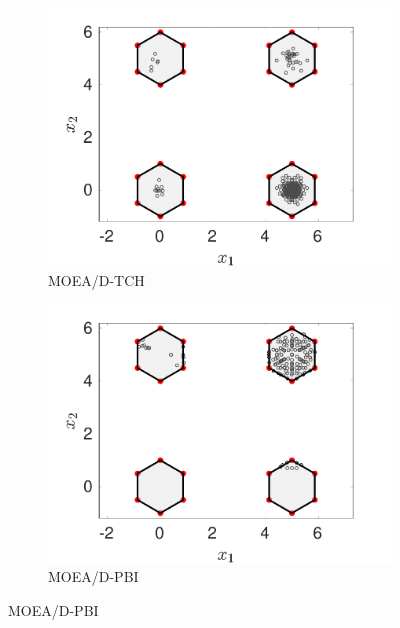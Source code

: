 \documentclass[conference]{IEEEtran}
\begin{document}
\begin{figure}[htbp]
    \begin{subfigure}[b]{.22\textwidth}
    \includegraphics[width=\linewidth]{Section5/dim2/PS/MOEAD_TCH}
    \caption{MOEA/D-TCH}
    \end{subfigure}
    \begin{subfigure}[b]{.22\textwidth}
    \includegraphics[width=\linewidth]{Section5/dim2/PS/MOEAD_PBI}
    \caption{MOEA/D-PBI}
    \end{subfigure}
    

\end{figure}
\end{document}
